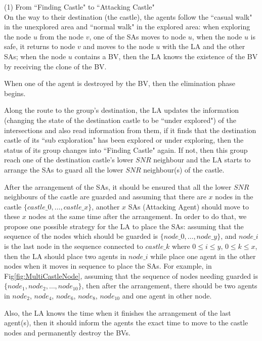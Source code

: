 (1) From ``Finding Castle" to ``Attacking Castle"\\
On the way to their destination (the castle), the agents follow the ``casual walk" in the unexplored area and ``normal walk" in the explored area: when exploring the node $u$ from the node $v$, one of the SAs moves to node $u$, when the node $u$ is safe, it returns to node $v$ and moves to the node $u$ with the LA and the other SAs; when the node $u$ contains a BV, then the LA knows the existence of the BV by receiving the clone of the BV.   

When one of the agent is destroyed by the BV, then the elimination phase begins.

Along the route to the group's destination, the LA updates the information (changing the state of the destination castle to be ``under explored") of the intersections and also read information from them, if it finds that the destination castle of its ``sub exploration" has been explored or under exploring, then the status of its group changes into ``Finding Castle" again. If not, then this group reach one of the destination castle's lower $SNR$ neighbour and the LA starts to arrange the SAs to guard all the lower $SNR$ neighbour(s) of the castle. 

After the arrangement of the SAs, it should be ensured that all the lower $SNR$ neighbours of the castle are guarded and assuming that there are $x$ nodes in the castle $\{castle\_0, \ldots, castle\_x\}$, another $x$ SAs (Attacking Agent) should move to these $x$ nodes at the same time after the arrangement. In order to do that, we propose one possible strategy for the LA to place the SAs: assuming that the sequence of the nodes which should be guarded is $\{node\_0, \ldots, node\_y\}$, and $node\_i$ is the last node in the sequence connected to $castle\_k$ where $0\leq i\leq y$, $0\leq k\leq x$, then the LA should place two agents in $node\_i$ while place one agent in the other nodes when it moves in sequence to place the SAs.
For example, in Fig\ref{fig:MultiCastleNode}, assuming that the sequence of nodes needing guarded is $\{node_1, node_2, \ldots, node_{10}\}$, then after the arrangement, there should be two agents in $node_2$, $node_4$, $node_6$, $node_8$, $node_{10}$ and one agent in other node.

Also, the LA knows the time when it finishes the arrangement of the last agent(s), then it should inform the agents the exact time to move to the castle nodes and permanently destroy the BVs.

